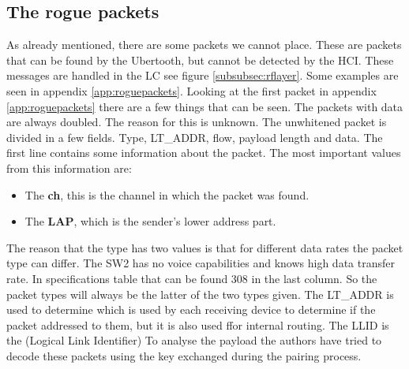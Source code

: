 \subsection{The rogue packets}
As already mentioned, there are some packets we cannot place. These are packets that can be found by the Ubertooth, but cannot be detected by the HCI. These messages are handled in the LC see figure \ref{subsubsec:rflayer}.
Some examples are seen in appendix \ref{app:roguepackets}.
Looking at the first packet in appendix \ref{app:roguepackets} there are a few things that can be seen. The packets with data are always doubled. The reason for this is unknown. The unwhitened packet is divided in a few fields. Type, LT\_ADDR, flow, payload length and data. The first line contains some information about the packet. The most important values from this information are:
\begin{itemize} 
\item The \textbf{ch}, this is the channel in which the packet was found.
\item The \textbf{LAP}, which is the sender's lower address part.
\end{itemize}
The reason that the type has two values is that for different data rates the packet type can differ. The SW2 has no voice capabilities and knows high data transfer rate. In specifications table that can be found 308 in the last column. So the packet types will always be the latter of the two types given.
The LT\_ADDR is used to determine which is used by each receiving device to determine if the packet addressed to them, but it is also used ffor internal routing.
The LLID is the (Logical Link Identifier)
To analyse the payload the authors have tried to decode these packets using the key exchanged during the pairing process.
